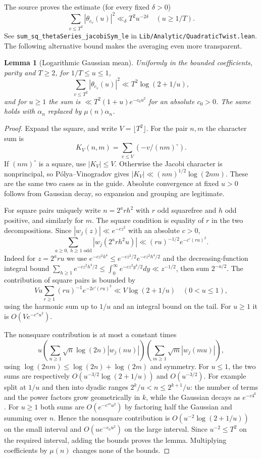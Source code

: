 \documentclass[11pt,a4paper]{article}
\newtheorem{lemma}[theorem]{Lemma}
\theoremstyle{remark}\newtheorem{remark}[theorem]{Remark}
\begin{document}
The source proves the estimate (for every fixed $\delta>0$)
\begin{equation}\label{eq:sourceS}
\sum_{v\le T^2}|\theta_{c_v}(u)|^2\ll_\delta T^2u^{-2\delta}\quad (u\ge1/T).
\end{equation}
See \texttt{sum\_sq\_thetaSeries\_jacobiSym\_le} in \texttt{Lib/Analytic/QuadraticTwist.lean}. The following alternative bound makes the averaging even more transparent.
\begin{lemma}[Logarithmic Gaussian mean]\label{lem:gaussian}
Uniformly in the bounded coefficients, parity and $T\ge2$, for $1/T\le u\le1$,
\[\sum_{v\le T^2}|\theta_{c_v}(u)|^2\ll T^2\log(2+1/u),\]
and for $u\ge1$ the sum is $\ll T^2(1+u)e^{-c_0u^2}$ for an absolute $c_0>0$. The same holds with $\alpha_n$ replaced by $\mu(n)\alpha_n$.
\end{lemma}
\begin{proof}
Expand the square, and write $V=\lfloor T^2\rfloor$. For the pair $n,m$ the character sum is
\[K_V(n,m)=\sum_{v\le V}(-v/(nm)^\circ).
\]
If $(nm)^\circ$ is a square, use $|K_V|\le V$. Otherwise the Jacobi character is nonprincipal, so P\'olya--Vinogradov gives $|K_V|\ll (nm)^{1/2}\log(2nm)$. These are the same two cases as in the guide. Absolute convergence at fixed $u>0$ follows from Gaussian decay, so expansion and grouping are legitimate.

For square pairs uniquely write $n=2^a r h^2$ with $r$ odd squarefree and $h$ odd positive, and similarly for $m$. The square condition is equality of $r$ in the two decompositions. Since $|w_j(z)|\ll e^{-c z^2}$ with an absolute $c>0$,
\[
\sum_{a\ge0,\ h\ge1\text{ odd}}|w_j(2^a r h^2u)|\ll (ru)^{-1/2}e^{-c'(ru)^2}.
\]
Indeed for $z=2^a ru$ we use $e^{-c z^2 h^4}\le e^{-cz^2/2}e^{-cz^2h^4/2}$ and the decreasing-function integral bound $\sum_{h\ge1}e^{-cz^2h^4/2}\le\int_0^\infty e^{-cz^2y^4/2}dy\ll z^{-1/2}$, then sum $2^{-a/2}$. The contribution of square pairs is bounded by
\[Vu\sum_{r\ge1}(ru)^{-1}e^{-2c'(ru)^2}\ll V\log(2+1/u)\quad (0<u\le1),\]
using the harmonic sum up to $1/u$ and an integral bound on the tail. For $u\ge1$ it is $O(Ve^{-c''u^2})$.

The nonsquare contribution is at most a constant times
\[u\left(\sum_{n\ge1}\sqrt n\log(2n)|w_j(nu)|\right)
\left(\sum_{m\ge1}\sqrt m|w_j(mu)|\right),\]
using $\log(2nm)\le\log(2n)+\log(2m)$ and symmetry. For $u\le1$, the two sums are respectively $O(u^{-3/2}\log(2+1/u))$ and $O(u^{-3/2})$. For example split at $1/u$ and then into dyadic ranges $2^k/u<n\le2^{k+1}/u$: the number of terms and the power factors grow geometrically in $k$, while the Gaussian decays as $e^{-c4^k}$. For $u\ge1$ both sums are $O(e^{-c'''u^2})$ by factoring half the Gaussian and summing over $n$. Hence the nonsquare contribution is $O(u^{-2}\log(2+1/u))$ on the small interval and $O(u e^{-c_0u^2})$ on the large interval. Since $u^{-2}\le T^2$ on the required interval, adding the bounds proves the lemma. Multiplying coefficients by $\mu(n)$ changes none of the bounds.
\end{proof}
\end{document}
